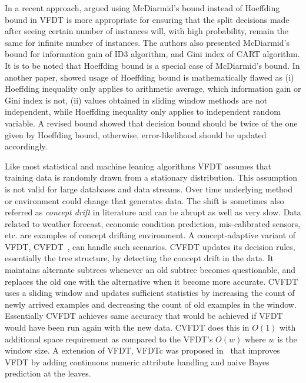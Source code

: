 In a recent approach, \cite{rutkowski13:vfdt} argued using McDiarmid’s bound instead of Hoeffding bound in VFDT is more appropriate for ensuring that the split decisions made after seeing certain number of instances will, with high probability, remain the same for infinite number of instances. The authors also presented McDiarmid’s bound for information gain of ID3 algorithm, and Gini index of CART algorithm. It is to be noted that Hoeffding bound is a special case of McDiarmid’s bound. In another paper, \cite{matuszyk:vfdt} showed usage of Hoeffding bound is mathematically flawed as (i) Hoeffding inequality only applies to arithmetic average, which information gain or Gini index is not, (ii) values obtained in sliding window methods are not independent, while Hoeffding inequality only applies to independent random variable. A revised bound showed that decision bound should be twice of the one given by Hoeffding bound, otherwise, error-likelihood should be updated accordingly.

Like most statistical and machine leaning algorithms VFDT assumes that training data is randomly drawn from a stationary distribution. This assumption is not valid for large databases and data streams. Over time underlying method or environment could change that generates data. The shift is sometimes also referred as {\it concept drift} in literature and can be abrupt as well as very slow. Data related to weather forecast, economic condition prediction, mis-calibrated sensors, etc. are examples of concept drifting environment. A concept-adaptive variant of VFDT, CVFDT~\cite{hulten01:cvfdt}, can handle such scenarios. CVFDT updates its decision rules, essentially the tree structure, by detecting the concept drift in the data. It maintains alternate subtrees whenever an old subtree becomes questionable, and replaces the old one with the alternative when it become more accurate. CVFDT uses a sliding window and updates sufficient statistics by increasing the count of newly arrived examples and decreasing the count of old examples in the window. Essentially CVFDT achieves same accuracy that would be achieved if VFDT would have been run again with the new data. CVFDT does this in $O(1)$ with additional space requirement as compared to the VFDT's $O(w)$ where $w$ is the window size. A extension of VFDT, VFDTc was proposed in~\cite{gama05:vfdtc} that improves VFDT by adding continuous numeric attribute handling and naive Bayes prediction at the leaves.

